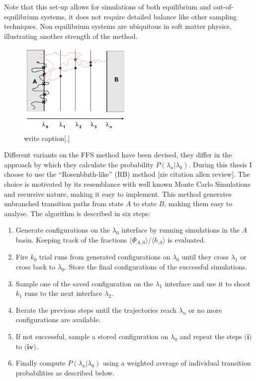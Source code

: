Note that this set-up allows for simulations of both equilibrium and out-of-equilibrium
systems, it does not require detailed balance like other sampling techniques. Non
equilibrium systems are ubiquitous in soft matter physics, illustrating another strength
of the method.
\begin{figure}[ht]
\begin{center}
  \includegraphics[width=0.5\textwidth]{Figures/FFS.png}
  \caption{write caption[.]}
\end{center}
\end{figure}
Different variants on the FFS method have been devised, they differ in the approach by
which they calculate the probability $P(\lambda_n|\lambda_0)$. During this thesis I
choose to use the “Rosenbluth-like” (RB) method [zie citation allen review]. The choice
is motivated
by its resemblance with well known Monte Carlo Simulations and recursive nature, making
it easy to implement.  This method generates unbranched transition paths from state $A$
to state $B$, making them easy to analyse. The algorithm is described in six steps:
\begin{enumerate}[label=\textbf{(\roman*)}]
   \item Generate configurations on the $\lambda_0$ interface by running
      simulations in the $A$ basin. Keeping track of the fractions $\langle
      \Phi_{A,0} \rangle/\langle h_{\mathcal{A}}\rangle$ is evaluated.
   \item Fire $k_0$ trial runs from generated configurations on $\lambda_0$ until they
      cross $\lambda_1$ or cross back to $\lambda_0$. Store the final configurations of
      the successful simulations.
   \item Sample one of the saved configuration on the $\lambda_1$ interface and use it to
      shoot $k_1$ runs to the next interface $\lambda_2$.
   \item Iterate the previous steps until the trajectories reach $\lambda_n$ or no more
     configurations are available.
   \item If not successful, sample a stored configuration on $\lambda_0$ and repeat the
      steps $\textbf{(i)}$ to $\textbf{(iv)}$.
   \item Finally compute $P(\lambda_n|\lambda_0)$ using a weighted average of individual
     transition probabilities as described below.
\end{enumerate}
